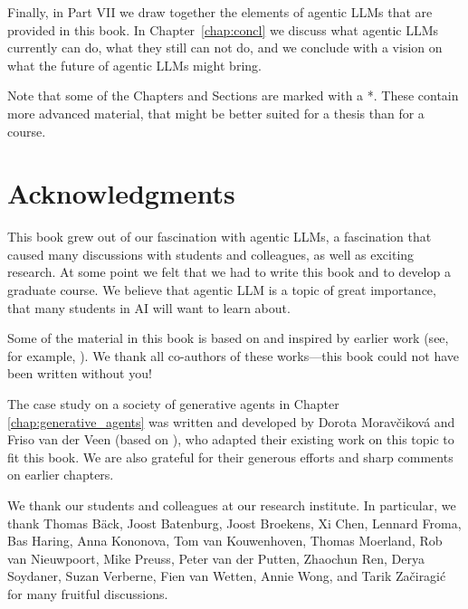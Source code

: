 Finally, in Part VII we draw together the elements of agentic LLMs that are provided in this book. In Chapter~\ref{chap:concl} we discuss what agentic LLMs currently can do, what they still can not do, and  we conclude with a vision on what the future of agentic LLMs might bring.

Note that some of the Chapters and Sections are marked with a *. These contain more advanced material, that might be better suited for a thesis than for a course.

\section{Acknowledgments}
This book grew out of our fascination with agentic LLMs, a fascination that caused many discussions with students and colleagues, as well as exciting research. At some point we felt that we had to write this book and to develop a graduate course. We believe that agentic LLM is a topic of great importance, that many students in AI will want to learn about. 

Some of the material in this book is based on and inspired by earlier work (see, for example, \citet{van2023theory,van2024hybrid,huisman2021survey,moerland2023model,plaat2022deep,plaat2024reasoning, plaat2025agentic,van2024llamea,chen2025does,van2025baba,xing2025cocomposer}). We thank all co-authors of these works---this book could not have been written without you!

The case study on a society of generative agents in Chapter \ref{chap:generative_agents} was written and developed by Dorota Moravčiková and Friso van der Veen (based on \citep{park2023generative}), who adapted their existing work on this topic to fit this book. We are also grateful for their generous efforts and sharp comments on  earlier chapters.

We thank our students and colleagues at our research institute. In particular, we thank Thomas B\"ack,  Joost Batenburg, Joost Broekens, Xi Chen, Lennard Froma, Bas Haring, Anna Kononova, Tom van Kouwenhoven, Thomas Moerland, Rob van Nieuwpoort, Mike Preuss, Peter van der Putten, Zhaochun Ren, Derya Soydaner, Suzan Verberne, Fien van Wetten, Annie Wong, and Tarik Začiragić for many fruitful discussions.



